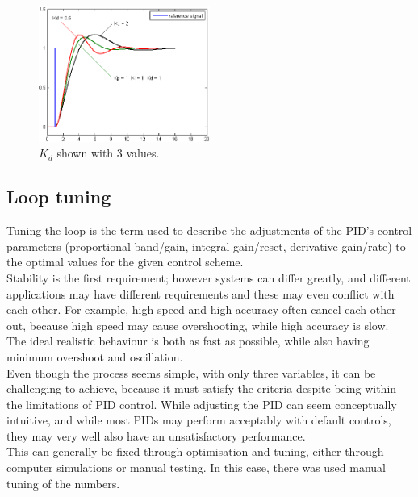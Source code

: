 \begin{figure}[h!]
  \centering
  \includegraphics[width=0.5\textwidth]{figures/Change_with_Kd.png}
  \caption{$K_d$ shown with 3 values.} 
  \label{PID controller}
\end{figure}



\subsection {Loop tuning} 

Tuning the loop is the term used to describe the adjustments of the PID’s control parameters (proportional band/gain, integral gain/reset, derivative gain/rate) to the optimal values for the given control scheme. \\ Stability is the first requirement; however systems can differ greatly, and different applications may have different requirements and these may even conflict with each other. For example, high speed and high accuracy often cancel each other out, because high speed may cause overshooting, while high accuracy is slow.\\ The ideal realistic behaviour is both as fast as possible, while also having minimum overshoot and oscillation. \\ 

Even though the process seems simple, with only three variables, it can be challenging to achieve, because it must satisfy the criteria despite being within the limitations of PID control. While adjusting the PID can seem conceptually intuitive, and while most PIDs may perform acceptably with default controls, they may very well also have an unsatisfactory performance.\\ This can generally be fixed through optimisation and tuning, either through computer simulations or manual testing. In this case, there was used manual tuning of the numbers.

